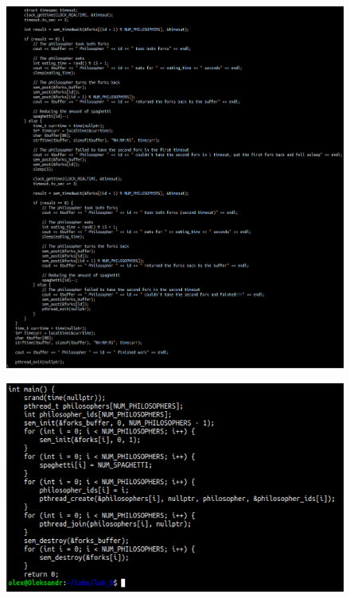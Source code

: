 \documentclass[a4paper,12pt]{article}
\begin{document}
\newpage
    \begin{figure}[h!]
        \begin{minipage}[h]{1\linewidth}
            \centering
            \includegraphics[width=0.8\linewidth]{Prt sc/Figure_4_2.png}  
        \end{minipage}
    \end{figure}
    \begin{figure}[h!]
        \begin{minipage}[h]{1\linewidth}
            \centering
            \includegraphics[width=0.8\linewidth]{Prt sc/Figure_4_3.png}  
        \end{minipage}
    \end{figure}
\end{document}
